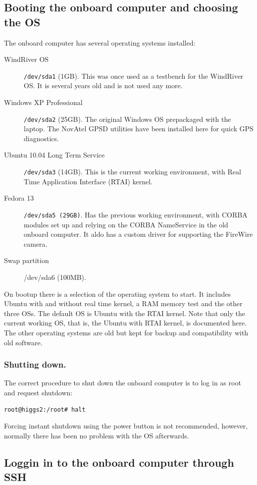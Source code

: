 \subsection{Booting the onboard computer and choosing the OS}

The onboard computer has several operating systems installed:
\begin{description} 
 \item[WindRiver OS] \texttt{/dev/sda1} (1GB). This was once used as a testbench for the WindRiver OS. It is several years old
and is not used any more.
 \item[Windows XP Professional] \texttt{/dev/sda2} (25GB). The original Windows OS prepackaged with the laptop. The NovAtel GPSD
utilities have been installed here for quick GPS diagnostics.
 \item[Ubuntu 10.04 Long Term Service] \texttt{/dev/sda3} (14GB). This is the current
   working environment, with Real Time Application Interface (RTAI) kernel.
 \item[Fedora 13] \texttt{/dev/sda5 (29GB)}. Has the previous working environment, with CORBA modules set up and relying on the CORBA NameService in the old onboard computer. It aldo has a custom driver for supporting the FireWire camera.
 \item[Swap partition] /dev/sda6 (100MB).
 \end{description}
On bootup there is a selection of the operating system to start. It includes Ubuntu with and without real time kernel,
a RAM memory test and the other three OSs. The default OS is Ubuntu with the RTAI kernel.
Note that only the current working OS, that is, the Ubuntu with RTAI kernel, is documented here.
The other operating systems are old but kept for backup and compatibility with old software.

\subsubsection{Shutting down.}
The correct procedure to shut down the onboard computer is to log in as root and request shutdown:
\begin{verbatim}
root@higgs2:/root# halt
\end{verbatim}
Forcing instant shutdown using the power button is not recommended, however, normally there has been no problem with the OS afterwards.

\subsection{Loggin in to the onboard computer through SSH}


